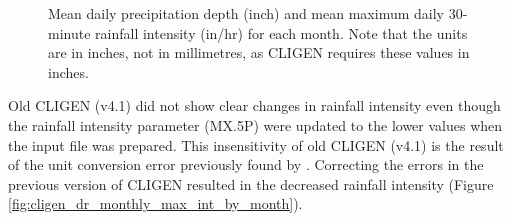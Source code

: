 \begin{figure}[htbp]
  \centering
  \caption[Mean daily precipitation depth and mean maximum daily 30-minute
rainfall intensity for each month]{Mean daily precipitation depth (inch) and
mean maximum daily 30-minute rainfall intensity (in/hr) for each month. Note
that the units are in inches, not in millimetres, as CLIGEN requires these
values in inches.}
  \label{fig:mean_p_mx5p_cligen}
\end{figure}

Old CLIGEN (v4.1) did not show clear changes in rainfall intensity even though
the rainfall intensity parameter ({MX.5P}) were updated to the lower values when
the input file was prepared. This insensitivity of old CLIGEN (v4.1) is the
result of the unit conversion error previously found by \citet{yu2000-301}.
Correcting the errors in the previous version of CLIGEN resulted in the
decreased rainfall intensity (Figure
\ref{fig:cligen_dr_monthly_max_int_by_month}).

